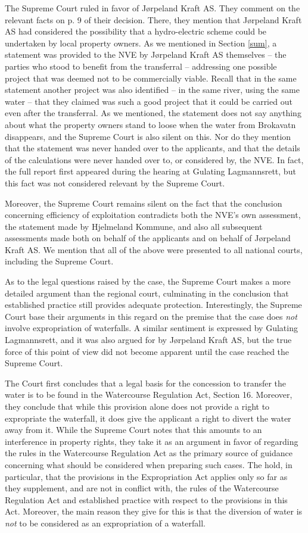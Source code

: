 The Supreme Court ruled in favor of Jørpeland Kraft AS. They comment on the relevant facts on 
p. 9 of their decision. There, they mention that Jørpeland Kraft AS had considered the possibility that a hydro-electric scheme could be undertaken by local property owners. As we mentioned in Section \ref{sum}, a statement was provided to the NVE by Jørpeland Kraft AS themselves -- the parties who stood to benefit from the transferral -- addressing one possible project that was deemed not to be commercially viable. Recall that in the same statement another project was also identified -- in the same river, using the same water -- that they claimed was such a good project that it could be carried out even after the transferral. As we mentioned, the statement does not say anything about what the property owners stand to loose when the water from Brokavatn disappears, and the Supreme Court is also silent on this. Nor do they mention that the statement was never handed over to the applicants, and that the details of the calculations were never handed over to, or considered by, the NVE. In fact, the full report first appeared during the hearing at Gulating Lagmannsrett, but this fact was not considered relevant by the Supreme Court.

Moreover, the Supreme Court remains silent on the fact that the conclusion concerning efficiency of exploitation contradicts both the NVE's own assessment, the statement made by Hjelmeland Kommune, and also all subsequent assessments made both on behalf of the applicants and on behalf of Jørpeland Kraft AS. We mention that all of the above were presented to all national courts, including the Supreme Court.

As to the legal questions raised by the case, the Supreme Court makes a more detailed argument than the regional court, culminating in the conclusion that established practice still provides adequate protection. Interestingly, the Supreme Court base their arguments in this regard on the premise that the case does \emph{not} involve expropriation of waterfalls. A similar sentiment is expressed by Gulating Lagmannsrett, and it was also argued for by Jørpeland Kraft AS, but the true force of this point of view did not become apparent until the case reached the Supreme Court. 

The Court first concludes that a legal basis for the concession to transfer the water is to be found in the Watercourse Regulation Act, Section 16. Moreover, they conclude that while this provision alone does not provide a right to expropriate the waterfall, it does give the applicant a right to divert the water away from it. While the Supreme Court notes that this amounts to an interference in property rights, they take it as an argument in favor of regarding the rules in the Watercourse Regulation Act as the primary source of guidance concerning what should be considered when preparing such cases. The hold, in particular, that the provisions in the Expropriation Act applies only so far as they supplement, and are not in conflict with, the rules of the Watercourse Regulation Act and established practice with respect to the provisions in this Act. Moreover, the main reason they give for this is that the diversion of water is \emph{not} to be considered as an expropriation of a waterfall.

